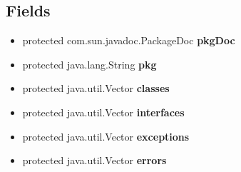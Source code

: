 \documentclass[11pt,a4paper]{report}
\begin{document}
{\subsection{Fields}{
\begin{itemize}
\item{
\label{org.stfm.texdoclet.Package.pkgDoc}\hypertarget{org.stfm.texdoclet.Package.pkgDoc}{protected com.sun.javadoc.PackageDoc {\bf  pkgDoc}}
}
\item{
\label{org.stfm.texdoclet.Package.pkg}\hypertarget{org.stfm.texdoclet.Package.pkg}{protected java.lang.String {\bf  pkg}}
}
\item{
\label{org.stfm.texdoclet.Package.classes}\hypertarget{org.stfm.texdoclet.Package.classes}{protected java.util.Vector {\bf  classes}}
}
\item{
\label{org.stfm.texdoclet.Package.interfaces}\hypertarget{org.stfm.texdoclet.Package.interfaces}{protected java.util.Vector {\bf  interfaces}}
}
\item{
\label{org.stfm.texdoclet.Package.exceptions}\hypertarget{org.stfm.texdoclet.Package.exceptions}{protected java.util.Vector {\bf  exceptions}}
}
\item{
\label{org.stfm.texdoclet.Package.errors}\hypertarget{org.stfm.texdoclet.Package.errors}{protected java.util.Vector {\bf  errors}}
}
\end{itemize}
}
}
\end{document}
